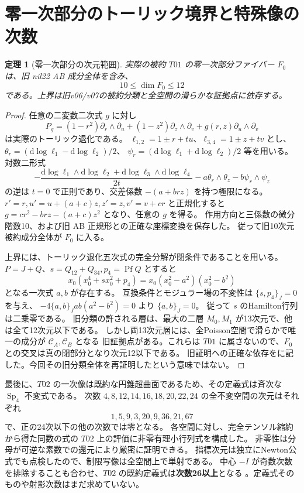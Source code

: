 \documentclass[11pt,a4paper]{ltjsarticle}
\newcommand{\dd}{\mathrm d}
\DeclareMathOperator{\Sp}{Sp}
\newtheorem{theorem}{定理}[section]
\theoremstyle{remark}
\begin{document}
\section{零一次部分のトーリック境界と特殊像の次数}
\begin{theorem}[零一次部分の次元範囲]
実際の被約 $T01$ の零一次部分ファイバー $F_0$ は、旧 nil22 AB 成分全体を含み、
\[
 10\leq\dim F_0\leq12
\]
である。上界は旧v06/v07の被約分類と全空間の滑らかな証拠点に依存する。
\end{theorem}
\begin{proof}
任意の二変数二次式 $g$ に対し
\[
 P_g=(1-r^2)\partial_r\wedge\partial_u+(1-z^2)\partial_z\wedge\partial_v
       +g(r,z)\partial_u\wedge\partial_v
\]
は実際のトーリック退化である。
$\ell_{1,2}=1\pm r+tu$、$\ell_{3,4}=1\pm z+tv$ とし、
$\theta_r=(\dd\log\ell_1-\dd\log\ell_2)/2$、
$\psi_r=(\dd\log\ell_1+\dd\log\ell_2)/2$ 等を用いる。
対数二形式
\[
 -\frac{\dd\log\ell_1\wedge\dd\log\ell_2+
             \dd\log\ell_3\wedge\dd\log\ell_4}{2t}
 -a\theta_r\wedge\theta_z-b\psi_r\wedge\psi_z
\]
の逆は $t=0$ で正則であり、交差係数 $-(a+brz)$ を持つ極限になる。
$r'=r,u'=u+(a+c)z,z'=z,v'=v+cr$ と正規化すると
$g=cr^2-brz-(a+c)z^2$ となり、任意の $g$ を得る。
作用方向と三係数の微分階数10、および旧 AB 正規形との正確な座標変換を保存した。
従って旧10次元被約成分全体が $F_0$ に入る\cite{zero-jet-v32}。

上界には、トーリック退化五次式の完全分解が閉条件であることを用いる。
$P=J+Q$、$s=Q_{12}+Q_{34},p_4=\operatorname{Pf}Q$ とすると
\[
 x_0(x_0^4+sx_0^2+p_4)=x_0(x_0^2-a^2)(x_0^2-b^2)
\]
となる一次式 $a,b$ が存在する。
互換条件とモジュラー場の不変性は $\{s,p_4\}_J=0$ を与え、
$-4\{a,b\}_Jab(a^2-b^2)=0$ より $\{a,b\}_J=0$。
従って $s$ のHamilton行列は二乗零である。
旧分類の許される層は、最大の二層 $M_0,M_1$ が13次元で、他は全て12次元以下である。
しかし両13次元層には、全Poisson空間で滑らかで唯一の成分が $\mathcal C_A,\mathcal C_B$ となる
旧証拠点がある。これらは $T01$ に属さないので、$F_0$ との交叉は真の閉部分となり次元12以下である。
旧証明への正確な依存を\cite{zero-jet-v32}に記した。今回その旧分類全体を再証明したという意味ではない。
\end{proof}

最後に、$T02$ の一次像は既約な円錐超曲面であるため、その定義式は斉次な $\Sp_4$ 不変式である。
次数 $4,8,12,14,16,18,20,22,24$ の全不変空間の次元はそれぞれ
\[
 1,5,9,3,20,9,36,21,67
\]
で、正の24次以下の他の次数では零となる。
各空間に対し、完全テンソル縮約から得た同数の式の $T02$ 上の評価に非零有理小行列式を構成した。
非零性は分母が可逆な素数での還元により厳密に証明できる。
指標次元は独立にNewton公式でも点検したので、制限写像は全空間上で単射である。
中心 $-I$ が奇数次数を排除することも合わせ、$T02$ の既約定義式は\textbf{次数26以上}となる
\cite{t02-degree-v32}。定義式そのものや射影次数はまだ求めていない。
\end{document}
